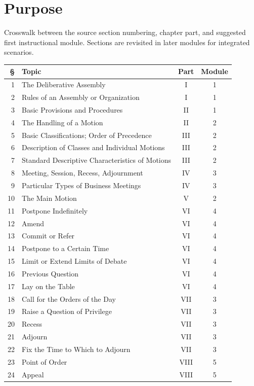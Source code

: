 \documentclass[11pt]{article}
\begin{document}
\SuiteOpen
{}
\section{Purpose}
Crosswalk between the source section numbering, chapter part, and suggested first instructional module. Sections are revisited in later modules for integrated scenarios.

\begin{longtable}{@{}r p{.64\linewidth} c c@{}}\toprule\textbf{§}&\textbf{Topic}&\textbf{Part}&\textbf{Module}\\\midrule\endhead
1 & The Deliberative Assembly & I & 1\\
2 & Rules of an Assembly or Organization & I & 1\\
3 & Basic Provisions and Procedures & II & 1\\
4 & The Handling of a Motion & II & 2\\
5 & Basic Classifications; Order of Precedence & III & 2\\
6 & Description of Classes and Individual Motions & III & 2\\
7 & Standard Descriptive Characteristics of Motions & III & 2\\
8 & Meeting, Session, Recess, Adjournment & IV & 3\\
9 & Particular Types of Business Meetings & IV & 3\\
10 & The Main Motion & V & 2\\
11 & Postpone Indefinitely & VI & 4\\
12 & Amend & VI & 4\\
13 & Commit or Refer & VI & 4\\
14 & Postpone to a Certain Time & VI & 4\\
15 & Limit or Extend Limits of Debate & VI & 4\\
16 & Previous Question & VI & 4\\
17 & Lay on the Table & VI & 4\\
18 & Call for the Orders of the Day & VII & 3\\
19 & Raise a Question of Privilege & VII & 3\\
20 & Recess & VII & 3\\
21 & Adjourn & VII & 3\\
22 & Fix the Time to Which to Adjourn & VII & 3\\
23 & Point of Order & VIII & 5\\
24 & Appeal & VIII & 5\\

\end{longtable}
\end{document}
